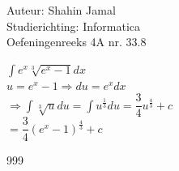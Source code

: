 \documentclass[a4paper]{article}
\begin{document}
  
\noindent \large Auteur: Shahin Jamal \\
\noindent \large Studierichting: Informatica\\
\noindent \large Oefeningenreeks 4A nr. 33.8\\

\medskip

\normalsize

$\displaystyle\int e^x\sqrt[3]{e^x-1}dx$\\

$u = e^x-1 \Rightarrow du = e^x dx$\\

$\Rightarrow \displaystyle\int \sqrt[3]{u}du = \displaystyle\int u^{\tfrac{1}{3}}du = \dfrac{3}{4}u^{\tfrac{4}{3}} + c$\\

$= \dfrac{3}{4}(e^x-1)^{\tfrac{4}{3}} + c$\\

\begin{thebibliography}{999}
\end{thebibliography}
\end{document}
